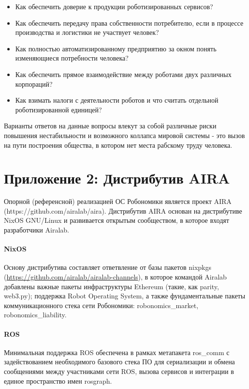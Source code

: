 \documentclass{article}
\begin{document}
\begin{itemize}
	\item Как обеспечить доверие к продукции роботизированных сервисов?
	\item Как обеспечить передачу права собственности потребителю, если в процессе производства и логистики не участвует человек?  
	\item Как полностью автоматизированному предприятию за окном понять изменяющиеся потребности человека?
	\item Как обеспечить прямое взаимодействие между роботами двух различных корпораций?
	\item Как взимать налоги с деятельности роботов и что считать отдельной роботизированной единицей?  
\end{itemize}

Варианты ответов на данные вопросы влекут за собой различные риски повышения нестабильности и возможного коллапса мировой системы - это вызов на пути построения общества, в котором нет места рабскому труду человека.

\section*{Приложение 2: Дистрибутив AIRA}

Опорной (референсной) реализацией ОС Робономики является проект AIRA (https://github.com/airalab/aira). Дистрибутив AIRA основан на дистрибутиве NixOS GNU/Linux и развивается открытым сообществом, в которое входят разработчики Airalab.

\paragraph{NixOS}

Основу дистрибутива составляет ответвление от базы пакетов nixpkgs (\url{https://github.com/airalab/airalab-channels}), в которое командой Airalab добавлены важные пакеты инфраструктуры Ethereum (такие, как parity, web3.py); поддержка Robot Operating System, а также фундаментальные пакеты коммуникационного стека сети Робономики: robonomics\_market, robonomics\_liability.

\paragraph{ROS}

Минимальная поддержка ROS обеспечена в рамках метапакета ros\_comm с задействованием необходимого базового стека ПО для сериализации и обмена сообщениями между участниками сети ROS, вызова сервисов и интеграции в единое пространство имен rosgraph.
	
\end{document}
